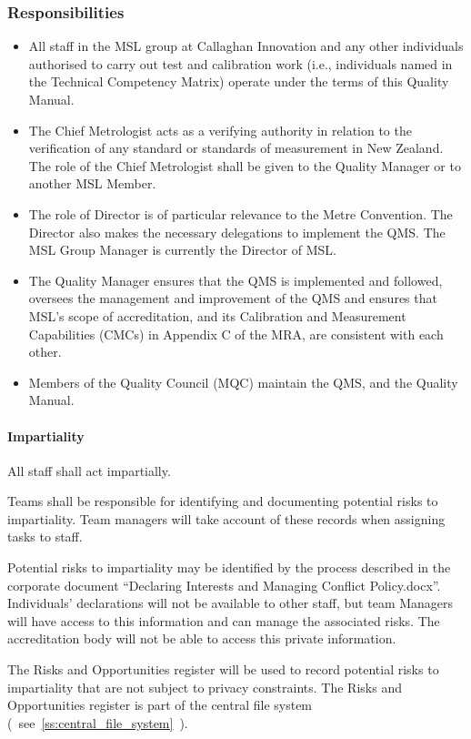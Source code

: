 \subsubsection{Responsibilities} 
\begin{itemize}
\item	All staff in the MSL group at Callaghan Innovation and any other individuals authorised to carry out test and calibration work (i.e., individuals named in the Technical Competency Matrix) operate under the terms of this Quality Manual.
\item	The Chief Metrologist acts as a verifying authority in relation to the verification of any standard or standards of measurement in New Zealand.  The role of the Chief Metrologist shall be given to the Quality Manager or to another MSL Member.  
\item	The role of Director is of particular relevance to the Metre Convention. The Director also makes the necessary delegations to implement the QMS. The MSL Group Manager is currently the Director of MSL. 
\item	The Quality Manager ensures that the QMS is implemented and followed, oversees the management and improvement of the QMS and ensures that MSL's scope of accreditation, and its Calibration and Measurement Capabilities (CMCs) in Appendix C of the MRA, are 
consistent with each other.
\item	Members of the Quality Council (MQC) maintain the QMS, and the Quality Manual.

\end{itemize}

\paragraph{Impartiality}
\label{sssp:impartiality}
All staff shall act impartially.

Teams shall be responsible for identifying and documenting potential risks to impartiality. Team managers will take account of these records when assigning tasks to staff.

Potential risks to impartiality may be identified by the process described in the corporate document ``Declaring Interests and Managing Conflict Policy.docx''. Individuals' declarations will not be available to other staff, but team Managers will have access to this information and can manage the associated risks. The accreditation body will not be able to access this private information. 

The Risks and Opportunities register will be used to record potential risks to impartiality that are not subject to privacy constraints. The Risks and Opportunities register is part of the central file system (~see~\ref{ss:central_file_system}~).

